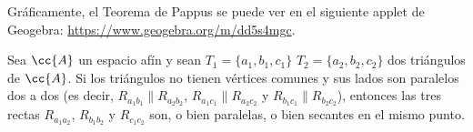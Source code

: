 Gráficamente, el Teorema de Pappus se puede ver en el siguiente applet de Geogebra: 
\href{https://www.geogebra.org/m/dd5s4mgc}{https://www.geogebra.org/m/dd5s4mgc}.

\begin{teo}
    Sea $\cc{A}$ un espacio afín y sean $T_1=\{a_1,b_1,c_1\}$ $T_2=\{a_2,b_2,c_2\}$ dos triángulos de $\cc{A}$.
    Si los triángulos no tienen vértices comunes y sus lados son paralelos dos a dos
    (es decir, $R_{a_1b_1}\|R_{a_2b_2}$, $R_{a_1c_1}\|R_{a_2c_2}$ y $R_{b_1c_1}\|R_{b_2c_2}$), entonces
    las tres rectas $R_{a_1a_2}$, $R_{b_1b_2}$ y $R_{c_1c_2}$ son, o bien paralelas, o bien secantes en el mismo punto.

    \begin{figure}[H]
        \centering
        \begin{subfigure}{0.5\linewidth}
            \centering\hspace{-0.3cm}
\end{subfigure}
\end{figure}
\end{teo}
